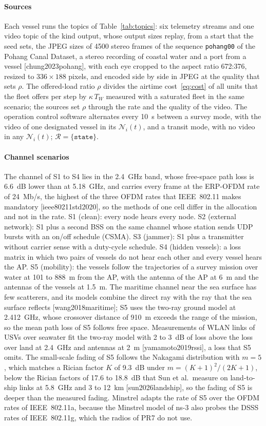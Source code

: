 \paragraph*{Sources} Each vessel runs the topics of Table~\ref{tab:topics}: six telemetry streams and one video topic of the kind output, whose output sizes replay, from a start that the seed sets, the JPEG sizes of 4500 stereo frames of the sequence \texttt{pohang00} of the Pohang Canal Dataset, a stereo recording of coastal water and a port from a vessel [chung2023pohang], with each eye cropped to the aspect ratio 672:376, resized to $336 \times 188$ pixels, and encoded side by side in JPEG at the quality that sets $\rho$. The offered-load ratio $\rho$ divides the airtime cost~\eqref{eq:cost} of all units that the fleet offers per step by $\kappa\,T_W$ measured with a saturated fleet in the same scenario; the sources set $\rho$ through the rate and the quality of the video. The operation control software alternates every 10~s between a survey mode, with the video of one designated vessel in its $\mathcal{N}_i(t)$, and a transit mode, with no video in any $\mathcal{N}_i(t)$; $\mathcal{R} = \{\texttt{state}\}$.

\paragraph*{Channel scenarios} The channel of S1 to S4 lies in the 2.4~GHz band, whose free-space path loss is 6.6~dB lower than at 5.18~GHz, and carries every frame at the ERP-OFDM rate of 24~Mb/s, the highest of the three OFDM rates that IEEE~802.11 makes mandatory [ieee80211std2020], so the methods of one cell differ in the allocation and not in the rate. S1 (clean): every node hears every node. S2 (external network): S1 plus a second BSS on the same channel whose station sends UDP bursts with an on/off schedule (CSMA). S3 (jammer): S1 plus a transmitter without carrier sense with a duty-cycle schedule. S4 (hidden vessels): a loss matrix in which two pairs of vessels do not hear each other and every vessel hears the AP. S5 (mobility): the vessels follow the trajectories of a survey mission over water at 101 to 888~m from the AP, with the antenna of the AP at 6~m and the antennas of the vessels at 1.5~m. The maritime channel near the sea surface has few scatterers, and its models combine the direct ray with the ray that the sea surface reflects [wang2018maritime]; S5 uses the two-ray ground model at 2.412~GHz, whose crossover distance of 910~m exceeds the range of the mission, so the mean path loss of S5 follows free space. Measurements of WLAN links of USVs over seawater fit the two-ray model with 2 to 3~dB of loss above the loss over land at 2.4~GHz and antennas at 2~m [yamamoto2019rssi], a loss that S5 omits. The small-scale fading of S5 follows the Nakagami distribution with $m = 5$, which matches a Rician factor $K$ of 9.3~dB under $m = (K+1)^2/(2K+1)$, below the Rician factors of 17.6 to 18.8~dB that Sun et al.\ measure on land-to-ship links at 5.8~GHz and 3 to 12~km [sun2026landship], so the fading of S5 is deeper than the measured fading. Minstrel adapts the rate of S5 over the OFDM rates of IEEE~802.11a, because the Minstrel model of ns-3 also probes the DSSS rates of IEEE~802.11g, which the radios of PR7 do not use.

